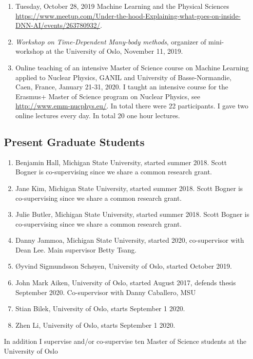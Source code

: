 \documentclass[prc,amsart,english,superscriptaddress,showpacs,floatfix]{revtex4}
\begin{document}
\begin{enumerate}
\item Tuesday, October 28, 2019 Machine Learning and the Physical Sciences \url{https://www.meetup.com/Under-the-hood-Explaining-what-goes-on-inside-DNN-AI/events/263780932/}. 
\item {\em Workshop on Time-Dependent Many-body methods}, organizer of mini-workshop at the University of Oslo, November 11, 2019.
\item Online teaching of an intensive Master of Science course on Machine Learning applied to Nuclear Physics, GANIL and University of Basse-Normandie, Caen, France, January 21-31, 2020. I taught an intensive course for the Erasmus+ Master of Science program on Nuclear Physics, see \url{http://www.emm-nucphys.eu/}. In total there were 22 participants. I gave two online lectures every day.  In total 20 one hour lectures. 
\end{enumerate}

\subsection*{Present Graduate Students}
\begin{enumerate}
\item Benjamin Hall, Michigan State University, started summer 2018. Scott Bogner is co-supervising  since we share a common research grant.
\item Jane Kim, Michigan State University, started summer 2018. Scott Bogner is co-supervising  since we share a common research grant.
\item Julie Butler, Michigan State University, started summer 2018. Scott Bogner is co-supervising  since we share a common research grant.
\item Danny Jammoa, Michigan State University, started 2020, co-supervisor with Dean Lee. Main supervisor Betty Tsang.
\item \O yvind Sigmundsson Sch\o yen, University of Oslo, started October 2019.
\item John Mark Aiken, University of Oslo, started August 2017, defends thesis September 2020. Co-supervisor with Danny Caballero, MSU
\item Stian Bilek, University of Oslo, starts September 1 2020.
\item Zhen Li, University of Oslo, starts September 1 2020.  
\end{enumerate}
In addition I supervise and/or co-supervise ten Master of Science students at the University of Oslo
\end{document}

